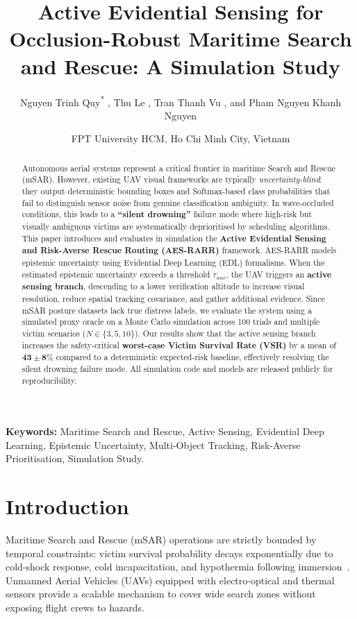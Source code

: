 \documentclass[11pt,a4paper]{article}
\title{\textbf{Active Evidential Sensing for Occlusion-Robust Maritime Search and Rescue: A Simulation Study}}
\author{
  Nguyen Trinh Quy\textsuperscript{*} ,
  Thu Le ,
  Tran Thanh Vu , and
  Pham Nguyen Khanh Nguyen
}
\date{\small FPT University HCM, Ho Chi Minh City, Vietnam}
\begin{document}
\maketitle

\begin{abstract}
Autonomous aerial systems represent a critical frontier in maritime Search and
Rescue (mSAR). However, existing UAV visual frameworks are typically
\emph{uncertainty-blind}: they output deterministic bounding boxes and
Softmax-based class probabilities that fail to distinguish sensor noise from genuine
classification ambiguity. In wave-occluded conditions, this leads to a
\textbf{``silent drowning''} failure mode where high-risk but visually ambiguous
victims are systematically deprioritised by scheduling algorithms.
This paper introduces and evaluates in simulation the \textbf{Active Evidential
Sensing and Risk-Averse Rescue Routing (AES-RARR)} framework.
AES-RARR models epistemic uncertainty using Evidential Deep Learning (EDL)
formalisms. When the estimated epistemic uncertainty exceeds a threshold
$\tau_{unc}$, the UAV triggers an \textbf{active sensing branch}, descending to a
lower verification altitude to increase visual resolution, reduce spatial tracking covariance, and gather additional evidence.
Since mSAR posture datasets lack true distress labels, we evaluate the system
using a simulated proxy oracle on a Monte Carlo simulation across 100 trials and
multiple victim scenarios ($N \in \{3, 5, 10\}$).
Our results show that the active sensing branch increases the safety-critical
\textbf{worst-case Victim Survival Rate (VSR)} by a mean of $\mathbf{43\pm8\%}$
compared to a deterministic expected-risk baseline, effectively resolving the silent drowning failure mode.
All simulation code and models are released publicly for reproducibility.
\end{abstract}

\textbf{Keywords:} Maritime Search and Rescue, Active Sensing, Evidential Deep
Learning, Epistemic Uncertainty, Multi-Object Tracking, Risk-Averse
Prioritisation, Simulation Study.

\section{Introduction}

Maritime Search and Rescue (mSAR) operations are strictly bounded by temporal
constraints: victim survival probability decays exponentially due to
cold-shock response, cold incapacitation, and hypothermia
following immersion~\cite{bierens2016,golden2002,tipton2011}.
Unmanned Aerial Vehicles (UAVs) equipped with electro-optical and
thermal sensors provide a scalable mechanism to cover wide search zones
without exposing flight crews to hazards.
\end{document}
